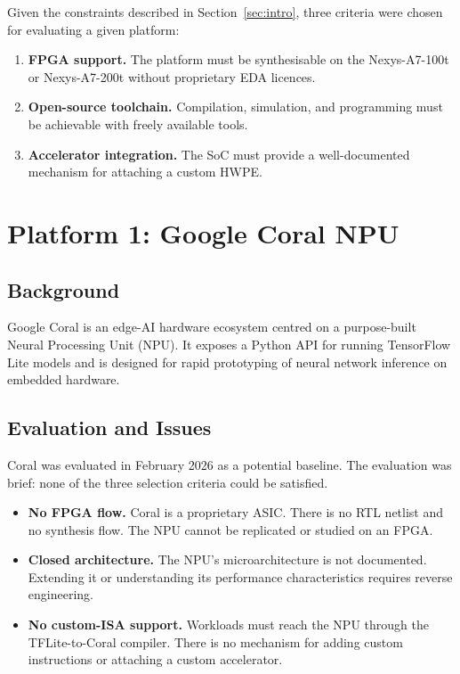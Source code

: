 \documentclass[journal]{IEEEtran}
\begin{document}
Given the constraints described in Section~\ref{sec:intro}, three
criteria were chosen for evaluating a given platform:

\begin{enumerate}
  \item \textbf{FPGA support.} The platform must be synthesisable on the
        Nexys-A7-100t or Nexys-A7-200t without proprietary EDA licences.
  \item \textbf{Open-source toolchain.} Compilation, simulation, and
        programming must be achievable with freely available tools.
  \item \textbf{Accelerator integration.} The SoC must provide a
        well-documented mechanism for attaching a custom HWPE.
\end{enumerate}

\section{Platform 1: Google Coral NPU}
\label{sec:coral}

\subsection{Background}

Google Coral is an edge-AI hardware ecosystem centred on a purpose-built
Neural Processing Unit (NPU). It exposes a Python API for running
TensorFlow Lite models and is designed for rapid prototyping of neural
network inference on embedded hardware.

\subsection{Evaluation and Issues}

Coral was evaluated in February 2026 as a potential baseline. The evaluation
was brief: none of the three selection criteria could be satisfied.

\begin{itemize}
  \item \textbf{No FPGA flow.} Coral is a proprietary ASIC. There is no
        RTL netlist and no synthesis flow. The NPU cannot be replicated or
        studied on an FPGA.
  \item \textbf{Closed architecture.} The NPU's microarchitecture is not
        documented. Extending it or understanding its performance
        characteristics requires reverse engineering.
  \item \textbf{No custom-ISA support.} Workloads must reach the NPU
        through the TFLite-to-Coral compiler. There is no mechanism for
        adding custom instructions or attaching a custom accelerator.
\end{itemize}
\end{document}
